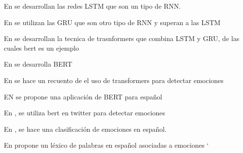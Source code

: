 En \cite{hochreiter1997long} se desarrollan las redes LSTM que son un tipo de RNN.

En \cite{chung2014empirical} se utilizan las GRU que son otro tipo de RNN y superan a las LSTM

En \cite{vaswani2017attention} se desarrollan la tecnica de trasnformers que combina LSTM y GRU, de las cuales bert es un ejemplo

En \cite{devlin2018bert} se desarrolla BERT

En \cite{acheampong2021transformer} se hace un recuento de el uso de transformers para detectar emociones

EN \cite{canete2020spanish} se propone una aplicación de BERT para español

En \cite{gonzalez2021twilbert}, \cite{huang2019ana} se utiliza bert en twitter para  detectar emociones

En \cite{plaza2020improved}, \cite{gil2013combining} se hace una clasificación de emociones en español.


En \cite{sidorov2012empirical} propone un léxico de palabras en español asociadas a emociones
`








